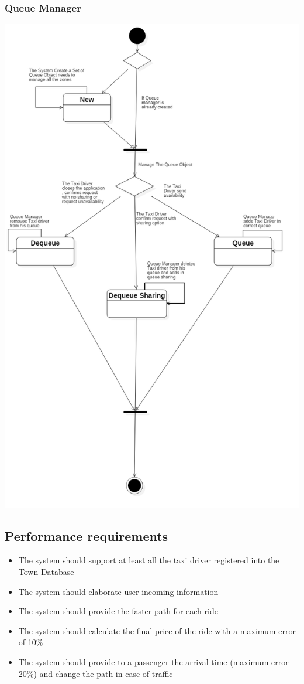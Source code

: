 \documentclass[english]{article}
\begin{document}
\subsubsection{Queue Manager}

\includegraphics[width=\textwidth,height=\textheight,keepaspectratio]{QueueManagerBehavior}


\subsection{Performance requirements}
\begin{itemize}
\item The system should support at least all the taxi driver registered
into the Town Database 
\item The system should elaborate user incoming information 
\item The system should provide the faster path for each ride 
\item The system should calculate the final price of the ride with a maximum
error of 10\% 
\item The system should provide to a passenger the arrival time (maximum
error 20\%) and change the path in case of traffic 
\end{itemize}
\end{document}
